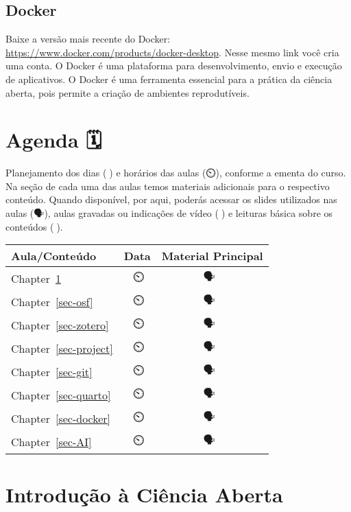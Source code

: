 \documentclass[
  a4paper,
]{article}
\begin{document}
\subsection*{Docker}\label{sec-dockerprework}


Baixe a versão mais recente do Docker:
\url{https://www.docker.com/products/docker-desktop}. Nesse mesmo link
você cria uma conta. O Docker é uma plataforma para desenvolvimento,
envio e execução de aplicativos. O Docker é uma ferramenta essencial
para a prática da ciência aberta, pois permite a criação de ambientes
reprodutíveis.


\section*{Agenda 🗓️}\label{sec-schedule}


Planejamento dos dias (📅) e horários das aulas (⏲️), conforme a ementa
do curso. Na seção de cada uma das aulas temos materiais adicionais para
o respectivo conteúdo. Quando disponível, por aqui, poderás acessar os
slides utilizados nas aulas (🗣️), aulas gravadas ou indicações de vídeo
(🎥) e leituras básica sobre os conteúdos (📓).

\begin{longtable}[]{@{}lcc@{}}
\toprule\noalign{}
Aula/Conteúdo & Data & Material Principal \\
\midrule\noalign{}
\endhead
\bottomrule\noalign{}
\endlastfoot
Chapter~\ref{sec-intro} & 📅⏲️ & 🗣️🎥📓 \\
Chapter~\ref{sec-osf} & 📅⏲️ & 🗣️🎥📓 \\
Chapter~\ref{sec-zotero} & 📅⏲️ & 🗣️🎥📓 \\
Chapter~\ref{sec-project} & 📅⏲️ & 🗣️🎥📓 \\
Chapter~\ref{sec-git} & 📅⏲️ & 🗣️🎥📓 \\
Chapter~\ref{sec-quarto} & 📅⏲️ & 🗣️🎥📓 \\
Chapter~\ref{sec-docker} & 📅⏲️ & 🗣️🎥📓 \\
Chapter~\ref{sec-AI} & 📅⏲️ & 🗣️🎥📓 \\
\end{longtable}


\section{Introdução à Ciência Aberta}\label{sec-intro}
\end{document}
